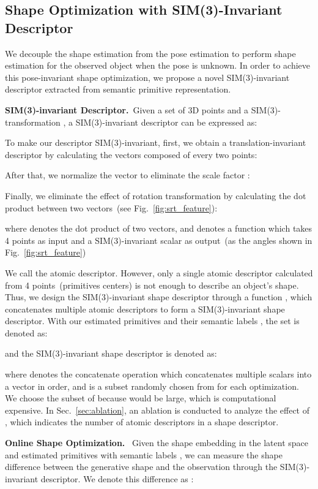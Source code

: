\documentclass{article}
\newcommand{\revise}[1]{\textcolor{revise}{#1}}
\begin{document}
\subsection{Shape Optimization with SIM(3)-Invariant Descriptor}
\label{sec:srt_feature}

We decouple the shape estimation from the pose estimation to perform shape estimation for the observed object when the pose is unknown.
In order to achieve this pose-invariant shape optimization, we propose a novel SIM(3)-invariant descriptor extracted from semantic primitive representation.

\textbf{SIM(3)-invariant Descriptor.}~Given a set of 3D points  and a SIM(3)-transformation , a SIM(3)-invariant descriptor  can be expressed as:

To make our descriptor SIM(3)-invariant, first, we obtain a translation-invariant descriptor by calculating the vectors  composed of every two points:

After that, we normalize the vector  to eliminate the scale factor :

Finally, we eliminate the effect of rotation transformation by calculating the dot product between two vectors~(see Fig.~\ref{fig:srt_feature}):

\revise{
where  denotes the dot product of two vectors, and  denotes a function which takes 4 points as input and a SIM(3)-invariant scalar as output~(as the angles shown in Fig.~\ref{fig:srt_feature})}

\revise{
We call  the atomic descriptor. However, only a single atomic descriptor calculated from 4 points~(primitives centers) is not enough to describe an object's shape. Thus, we design the SIM(3)-invariant shape descriptor through a function , which concatenates multiple atomic descriptors to form a SIM(3)-invariant shape descriptor. With our estimated primitives  and their semantic labels , the set  is denoted as:}


\revise{
and the SIM(3)-invariant shape descriptor  is denoted as:}


\revise{
where  denotes the concatenate operation which concatenates multiple scalars into a vector in order, and  is a subset randomly chosen from  for each optimization. We choose the subset of  because  would be large, which is computational expensive. In Sec.~\ref{sec:ablation}, an ablation is conducted to analyze the effect of , which indicates the number of atomic descriptors in a shape descriptor.
}

\textbf{Online Shape Optimization.}~
Given the shape embedding  in the latent space and estimated primitives  with semantic labels , we can measure the shape difference between the generative shape  and the observation  through the SIM(3)-invariant descriptor. We denote this difference as :
\end{document}

